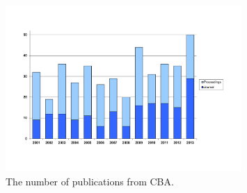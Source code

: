 {%
%
%
%
%
\begin{figure}[!h] 
\centering
\includegraphics[angle=0, width=0.8\textwidth, viewport=50 100 790 520, clip]{./figures/CBA_pub_2013.pdf}
\caption{The number of publications from CBA.
\label{fig:publications}}
\end{figure}
}



